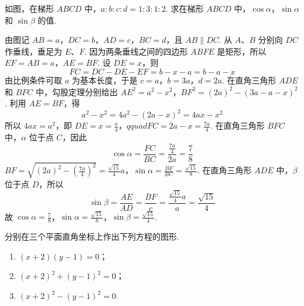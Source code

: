\begin{problem}
如图，在梯形 \(ABCD\) 中，\(a:b:c:d=1:3:1:2\). 求在梯形 \(ABCD\) 中，\(\cos\alpha\)，\(\sin\alpha\) 和 \(\sin\beta\) 的值.

\end{problem}

\begin{solution}
由图记 \(AB=a\)，\(DC=b\)，\(AD=c\)，\(BC=d\)，且 \(AB\parallel DC\). 从 \(A\)、\(B\) 分别向 \(DC\) 作垂线，垂足为 \(E\)、\(F\). 因为两条垂线之间的四边形 \(ABFE\) 是矩形，所以
\(EF=AB=a\)，\(AE=BF\).
设 \(DE=x\)，则
\[
FC=DC-DE-EF=b-x-a=b-a-x
\]
由比例条件可取 \(a\) 为基本长度，于是
\(c=a\)，\(b=3a\)，\(d=2a\).
在直角三角形 \(ADE\) 和 \(BFC\) 中，勾股定理分别给出
\(AE^2=a^2-x^2\)，\(BF^2=(2a)^2-(3a-a-x)^2\).
利用 \(AE=BF\)，得
\[
a^2-x^2=4a^2-(2a-x)^2=4ax-x^2
\]
所以 \(4ax=a^2\)，即
\(DE=x=\frac a4\)，\(qquad FC=2a-x=\frac{7a}{4}\).
在直角三角形 \(BFC\) 中，\(\alpha\) 位于点 \(C\)，因此
\[
\cos\alpha=\frac{FC}{BC}=\frac{\frac{7a}{4}}{2a}=\frac78
\]
\(BF=\sqrt{(2a)^2-\left(\frac{7a}{4}\right)^2}=\frac{\sqrt{15}}4a\)，\(\sin\alpha=\frac{BF}{BC}=\frac{\sqrt{15}}8\).
在直角三角形 \(ADE\) 中，\(\beta\) 位于点 \(D\)，所以
\[
\sin\beta=\frac{AE}{AD}=\frac{BF}{c}
=\frac{\frac{\sqrt{15}}4a}{a}=\frac{\sqrt{15}}4
\]
故 \(\cos\alpha=\frac78\)，\(\sin\alpha=\frac{\sqrt{15}}8\)，\(\sin\beta=\frac{\sqrt{15}}4\).
\end{solution}

\begin{problem}
分别在三个平面直角坐标上作出下列方程的图形.

\begin{enumerate}
\item \(\left(x+2\right)\left(y-1\right)=0\)；
\item \(\left(x+2\right)^2+\left(y-1\right)^2=0\)；
\item \(\left(x+2\right)^2-\left(y-1\right)^2=0\).
\end{enumerate}
\end{problem}

